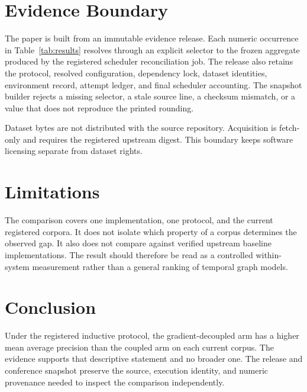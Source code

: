 \documentclass[conference]{IEEEtran}
\begin{document}
\section{Evidence Boundary}

The paper is built from an immutable evidence release. Each numeric occurrence
in Table~\ref{tab:results} resolves through an explicit selector to the frozen
aggregate produced by the registered scheduler reconciliation job. The release
also retains the protocol, resolved configuration, dependency lock, dataset
identities, environment record, attempt ledger, and final scheduler
accounting. The snapshot builder rejects a missing selector, a stale source
line, a checksum mismatch, or a value that does not reproduce the printed
rounding.

Dataset bytes are not distributed with the source repository. Acquisition is
fetch-only and requires the registered upstream digest. This boundary keeps
software licensing separate from dataset rights.

\section{Limitations}

The comparison covers one implementation, one protocol, and the current
registered corpora. It does not isolate which property of a corpus determines
the observed gap. It also does not compare against verified upstream baseline
implementations. The result should therefore be read as a controlled
within-system measurement rather than a general ranking of temporal graph
models.

\section{Conclusion}

Under the registered inductive protocol, the gradient-decoupled arm has a
higher mean average precision than the coupled arm on each current corpus.
The evidence supports that descriptive statement and no broader one. The
release and conference snapshot preserve the source, execution identity, and
numeric provenance needed to inspect the comparison independently.
\end{document}
